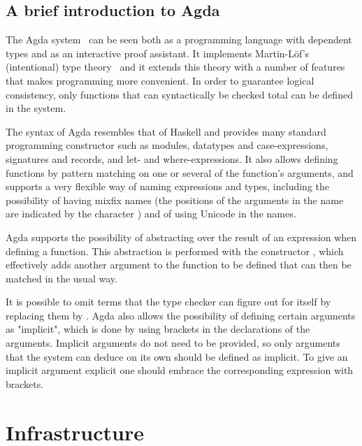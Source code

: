 \documentclass{entcs}
\begin{document}

\subsection{A brief introduction to Agda}

The Agda system~\cite{agdawiki} can be seen both as a programming language with dependent types and as an interactive proof assistant. It implements Martin-Löf's (intentional) type theory~\cite{mlof90} and it extends this theory with a number of features that makes programming more convenient. In order to guarantee logical consistency, only functions that can syntactically be checked total can be defined in the system.

The syntax of Agda resembles that of Haskell and provides many standard programming constructor such as modules, datatypes and case-expressions, signatures and records, and let- and where-expressions. It also allows defining functions by pattern matching on one or several of the function's arguments, and supports a very flexible way of naming expressions and types, including the possibility of having mixfix names (the positions of the arguments in the name are indicated by the character \AgdaSymbol{\_}) and of using Unicode in the names.

Agda supports the possibility of abstracting over the result of an expression when defining a function. This abstraction is performed with the constructor , which effectively adds another argument to the function to be defined that can then be matched in the usual way.

It is possible to omit terms that the type checker can figure out for itself by replacing them by \AgdaSymbol{\_}. Agda also allows the possibility of defining certain arguments as "implicit", which is done by using brackets in the declarations of the arguments. Implicit arguments do not need to be provided, so only arguments that the system can deduce on its own should be defined as implicit. To give an implicit argument explicit one should embrace the corresponding expression with brackets. 



\section{Infrastructure}
\label{sec:infra}

 \hspace{5px}
\end{document}
